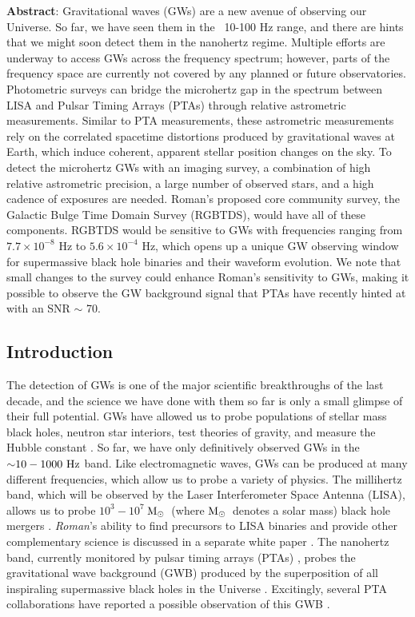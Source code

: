 \documentclass[12pt]{article}
\def\roman{\textit{Roman}\xspace}
\def\msun{${\rm{M}_\odot}$}
\newcommand{\e}[1]{\times 10^{#1}}
\begin{document}
\noindent \textbf{Abstract}:
Gravitational waves (GWs) are a new avenue of observing our Universe. So far, we have seen them in the ~10-100 Hz range, and there are hints that we might soon detect them in the nanohertz regime. Multiple efforts are underway to access GWs across the frequency spectrum; however, parts of the frequency space are currently not covered by any planned or future observatories. Photometric surveys can bridge the microhertz gap in the spectrum between LISA and Pulsar Timing Arrays (PTAs) through relative astrometric measurements. Similar to PTA measurements, these astrometric measurements rely on the correlated spacetime distortions produced by gravitational waves at Earth, which induce coherent, apparent stellar position changes on the sky. To detect the
 microhertz GWs with an imaging survey, a combination of high relative astrometric precision, a large number of observed stars, and a high cadence of exposures are needed. Roman's proposed core community survey, the Galactic Bulge Time Domain Survey (RGBTDS), would have all of these components. RGBTDS would be sensitive to GWs with frequencies ranging from $7.7\e{-8}$ Hz to  $5.6\e{-4}$ Hz, which opens up a unique GW observing window for supermassive black hole binaries and their waveform evolution. We note that small changes to the survey could enhance Roman's sensitivity to GWs, making it possible to observe the GW background signal that PTAs have recently hinted at with an SNR $\sim$ 70.


\newpage

\subsection*{Introduction}
\vspace{-0.1cm}
\noindent The detection of GWs is one of the major scientific breakthroughs of the last decade, and the science we have done with them so far is only a small glimpse of their full potential. GWs have allowed us to probe populations of stellar mass black holes, neutron star interiors, test theories of gravity, and measure the Hubble constant \citep{GW150914, GW170817, GW170817_NSEOS, GW170817GRTests, Baker2017, Ezquiaga2017,  GW170817_H0}. So far, we have only definitively observed GWs in the ${\sim} 10-1000~\rm{Hz}$ band. Like electromagnetic waves, GWs can be produced at many different frequencies, which allow us to probe a variety of physics. The millihertz band, which will be observed by the Laser Interferometer Space Antenna (LISA), allows us to probe $10^3-10^7~$\msun\ (where \msun\ denotes a solar mass) black hole mergers \citep{LISA}. \roman's ability to find precursors to LISA binaries and provide other complementary science is discussed in a separate white paper \citep{Haiman2023}. The nanohertz band, currently monitored by pulsar timing arrays (PTAs) \citep[e.g.,][]{NANOGRAV, EPTA}, probes the gravitational wave background (GWB) produced by the superposition of all inspiraling supermassive black holes in the Universe \citep{Phinney2001}. Excitingly, several PTA collaborations have reported a possible observation of this GWB \citep{NGGWBhint, EPTAGWBhint, PPTAGWBhint, IPTAGWBhint}. 
\end{document}
